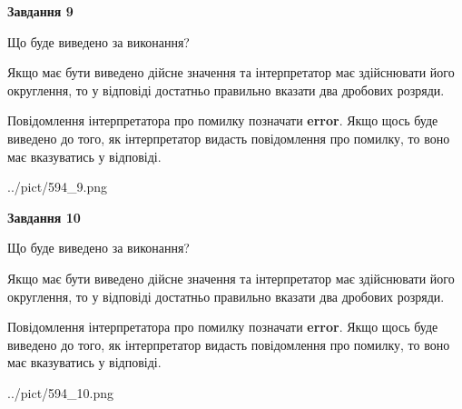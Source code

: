 \documentclass[12pt, ukrainian]{article}
\begin{document}
{\begin {Large}
{\begin {center}\textbf{Завдання 9}\end {center}}\par
Що буде виведено за виконання? \par

Якщо має бути виведено дійсне значення та інтерпретатор має здійснювати його округлення, 
то у відповіді достатньо правильно вказати два дробових розряди.

Повідомлення інтерпретатора про помилку позначати \textbf{error}.
Якщо щось буде виведено до того, як інтерпретатор видасть повідомлення про помилку, 
то воно має вказуватись у відповіді. \par

\begin{center}
	{../pict/594_9.png}
\end{center}
\newpage

{\begin {center}\textbf{Завдання 10}\end {center}}\par
Що буде виведено за виконання? \par

Якщо має бути виведено дійсне значення та інтерпретатор має здійснювати його округлення, 
то у відповіді достатньо правильно вказати два дробових розряди.

Повідомлення інтерпретатора про помилку позначати \textbf{error}.
Якщо щось буде виведено до того, як інтерпретатор видасть повідомлення про помилку, 
то воно має вказуватись у відповіді. \par

\begin{center}
	{../pict/594_10.png}
\end{center}
\newpage

\end {Large}}
\end{document}

